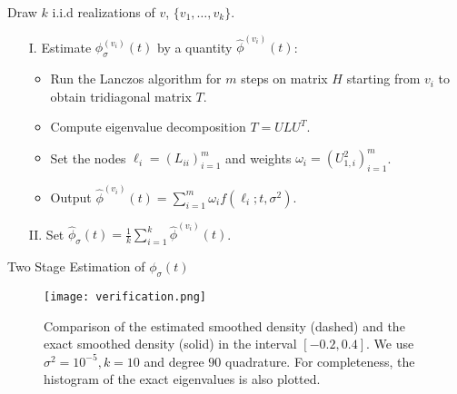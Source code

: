 \documentclass[conference]{IEEEtran}
\newcommand{\phis}{\phi_{\sigma}}
\DeclareMathOperator{\1}{\mathbf{1}}
\theoremstyle{definition}
\begin{document}
    \begin{algorithm}[H] 
        Draw $k$ i.i.d realizations of $v$, $\{v_1 , \dots, v_k\}$.\;
        \begin{itemize}
        \item[I.]  Estimate $\phis^{(v_i)}(t)$ by a quantity $\widehat{\phi}^{(v_i)}(t)$:
        \begin{itemize}
            \item Run the Lanczos algorithm for $m$ steps on matrix $H$ starting from $v_i$ to obtain tridiagonal matrix $T$.
            \item Compute eigenvalue decomposition $T = ULU^T$.
            \item Set the nodes $\ell_i = (L_{ii})_{i=1}^m$ and weights $\omega_i = (U^2_{1,i})_{i=1}^m$.
            \item Output $\widehat{\phi}^{(v_i)}(t) = \sum_{i=1}^m \omega_i f(\ell_i; t, \sigma^2)$.
        \end{itemize}
        \item[II.] Set $\widehat{\phi}_{\sigma}(t) = \frac{1}{k}\sum_{i=1}^k \widehat{\phi}^{(v_i)}(t)$.
        \end{itemize}
        \caption{Two Stage Estimation of $\phis(t)$} \label{meta_alg}
        \end{algorithm}
        \begin{figure}[h]
            \texttt{[image: verification.png]}
            \vspace{-0.5cm}
            \caption{Comparison of the estimated smoothed density (dashed) and the exact smoothed density (solid) in the interval $[-0.2, 0.4]$. We use $\sigma^2 = 10^{-5}, k=10$ and degree $90$ quadrature. For completeness, the histogram of the exact eigenvalues is also plotted. \label{fig:verification}}
            \end{figure}
            
\end{document}

